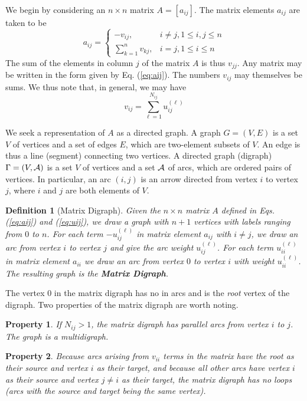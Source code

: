 \documentclass{article}
\newtheorem{defn}{Definition}
\newtheorem{property}{Property}
\begin{document}
We begin by considering an $n \times n$ matrix $A = \left[a_{ij}\right]$.
The matrix elements $a_{ij}$ are taken to be
\begin{equation}
a_{ij} = 
\begin{cases}
-v_{ij}, & i\ne j, 1 \leq i, j \leq n\\
 \sum_{k = 1}^n v_{kj}, & i = j, 1 \leq i \leq n
\end{cases}
\label{eq:aij}
\end{equation}
The sum of the elements in column $j$ of the matrix $A$ is thus $v_{jj}$.
Any matrix may be written in the form given by Eq. (\ref{eq:aij}).  The
numbers $v_{ij}$ may themselves be sums.  We thus note that, in general, we
may have
\begin{equation}
v_{ij} = \sum_{\ell=1}^{N_{ij}}  u_{ij}^{(\ell)}
\label{eq:uij}
\end{equation}

We seek a representation of $A$ as a directed graph.
A graph $G = (V,E)$ is a set $V$ of vertices and a
set of edges $E$, which are two-element subsets of $V$.  An edge is thus
a line (segment) connecting two vertices.  A directed graph (digraph)
$\Gamma = (V,\cal{A})$ is a set $V$ of vertices and a set $\cal{A}$ of
arcs, which are ordered pairs of vertices.  In particular, an arc $(i,j)$
is an arrow directed from vertex $i$ to vertex $j$, where $i$ and $j$ are
both elements of $V$.

\begin{defn}[Matrix Digraph]
Given the $n \times n$ matrix $A$ defined in Eqs. (\ref{eq:aij}) and
(\ref{eq:uij}),
we draw a graph with $n+1$ vertices with labels ranging from $0$ to $n$.
For each term $-u_{ij}^{(\ell)}$ in matrix element $a_{ij}$ with $i \ne j$,
we draw an arc
from vertex $i$ to vertex $j$ and give the arc weight $u_{ij}^{(\ell)}$.
For each term $u_{ii}^{(\ell)}$ in matrix element $a_{ii}$ we draw an arc
from vertex $0$ to vertex $i$ with weight $u_{ii}^{(\ell)}$.  The resulting
graph is the {\bf Matrix Digraph}.
\label{defn:matdigraph}
\end{defn}

The vertex $0$ in the matrix digraph has no in arcs and is the {\it root} vertex
of the digraph.
Two properties of the matrix digraph are worth noting.
\begin{property}
If $N_{ij} > 1$, the matrix digraph has parallel arcs from vertex $i$ to $j$.
The graph is a multidigraph.
\end{property}
\begin{property}
Because arcs arising from $v_{ii}$ terms in the matrix have the root 
as their source and vertex $i$ as their target, and because all other arcs
have vertex $i$ as their source and vertex $j \neq i$ as their target,
the matrix digraph has no loops (arcs with the source and
target being the same vertex).
\label{prop:loop}
\end{property}
\end{document}
